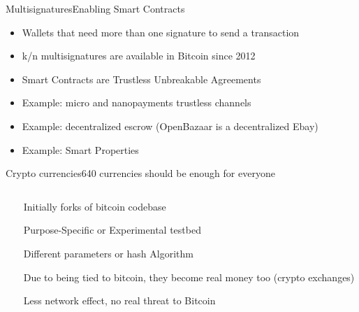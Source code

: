 \documentclass[english,compress]{beamer}
\begin{document}
\begin{frame}{Multisignatures}{Enabling Smart Contracts}
\begin{itemize}
\item Wallets that need more than one signature to send a transaction
\item k/n multisignatures are available in Bitcoin since 2012
\item Smart Contracts are Trustless Unbreakable Agreements
\item Example: micro and nanopayments trustless channels
\item Example: decentralized escrow (OpenBazaar is a decentralized Ebay)
\item Example: Smart Properties
\end{itemize}

\end{frame}



\begin{frame}{Crypto currencies}{640 currencies should be enough for everyone}
 \begin{columns}
  \begin{column}{0.5 \textwidth}
  \end{column}
  
 \begin{column}{0.4 \textwidth}
\begin{itemize}
\begin{small}   
    \item Initially forks of bitcoin codebase
    \item Purpose-Specific or Experimental testbed
    \item Different parameters or hash Algorithm
    \item Due to being tied to bitcoin, they become real money too (crypto exchanges)
    \item Less network effect, no real threat to Bitcoin
\end{small}
   \end{itemize}
  \end{column}
  \hfill
  \end{columns}
\end{frame}
\end{document}

